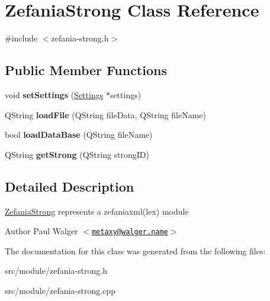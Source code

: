 \hypertarget{classZefaniaStrong}{
\section{ZefaniaStrong Class Reference}
\label{classZefaniaStrong}
}


{\ttfamily \#include $<$zefania-\/strong.h$>$}\subsection*{Public Member Functions}
\begin{DoxyCompactItemize}
\item 
\hypertarget{classZefaniaStrong_a393ceabf1e0ec34def99a79a941e042d}{
void {\bfseries setSettings} (\hyperlink{classSettings}{Settings} $\ast$settings)}
\label{classZefaniaStrong_a393ceabf1e0ec34def99a79a941e042d}

\item 
\hypertarget{classZefaniaStrong_aff50283c4e68f6d6760609b0d42a8c2c}{
QString {\bfseries loadFile} (QString fileData, QString fileName)}
\label{classZefaniaStrong_aff50283c4e68f6d6760609b0d42a8c2c}

\item 
\hypertarget{classZefaniaStrong_aed2e5d60535ea142164ac03f0f2309c4}{
bool {\bfseries loadDataBase} (QString fileName)}
\label{classZefaniaStrong_aed2e5d60535ea142164ac03f0f2309c4}

\item 
\hypertarget{classZefaniaStrong_a30c0077f7320e33e50890dce8c72af99}{
QString {\bfseries getStrong} (QString strongID)}
\label{classZefaniaStrong_a30c0077f7320e33e50890dce8c72af99}

\end{DoxyCompactItemize}


\subsection{Detailed Description}
\hyperlink{classZefaniaStrong}{ZefaniaStrong} represents a zefaniaxml(lex) module

\begin{DoxyAuthor}{Author}
Paul Walger $<$\href{mailto:metaxy@walger.name}{\tt metaxy@walger.name}$>$ 
\end{DoxyAuthor}


The documentation for this class was generated from the following files:\begin{DoxyCompactItemize}
\item 
src/module/zefania-\/strong.h\item 
src/module/zefania-\/strong.cpp\end{DoxyCompactItemize}
